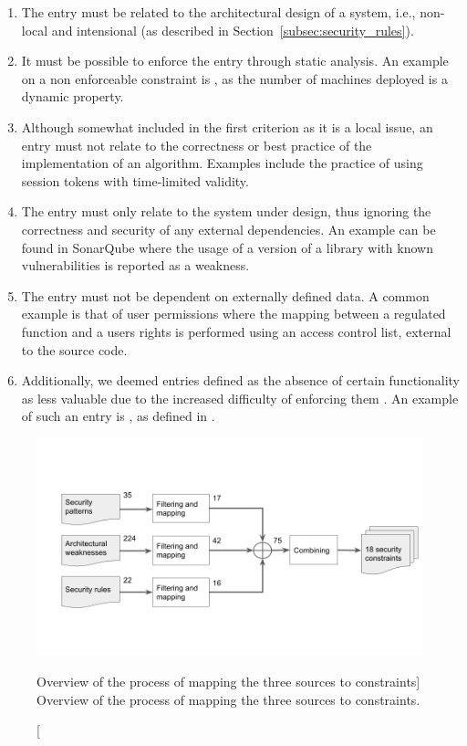 \begin{enumerate}
    \item The entry must be related to the architectural design of a system, i.e., non-local and intensional (as described in Section~\ref{subsec:security_rules}). \label{criterion_1}
    \item It must be possible to enforce the entry through static analysis. An example on a non enforceable constraint is  \cite{franch_constraining_2019}, as the number of machines deployed is a dynamic property. \label{criterion_2}
    \item Although somewhat included in the first criterion as it is a local issue, an entry must not relate to the correctness or best practice of the implementation of an algorithm. Examples include the practice of using session tokens with time-limited validity. \label{criterion_3}
    \item The entry must only relate to the system under design, thus ignoring the correctness and security of any external dependencies. An example can be found in SonarQube where the usage of a version of a library with known vulnerabilities is reported as a weakness. \label{criterion_4}
    \item The entry must not be dependent on externally defined data. A common example is that of user permissions where the mapping between a regulated function and a users rights is performed using an access control list, external to the source code. \label{criterion_5}
    \item Additionally, we deemed entries defined as the absence of certain functionality as less valuable due to the increased difficulty of enforcing them \cite{haley_security_2008}. An example of such an entry is , as defined in \cite{franch_constraining_2019}.
\end{enumerate}

\begin{figure}
    \centering
    \includegraphics[width=\textwidth]{figure/Half-time presentation.png}
    \caption
        [Overview of the process of mapping the three sources to constraints]
        {Overview of the process of mapping the three sources to constraints.}
    \label{fig:mapping_process}
\end{figure}


